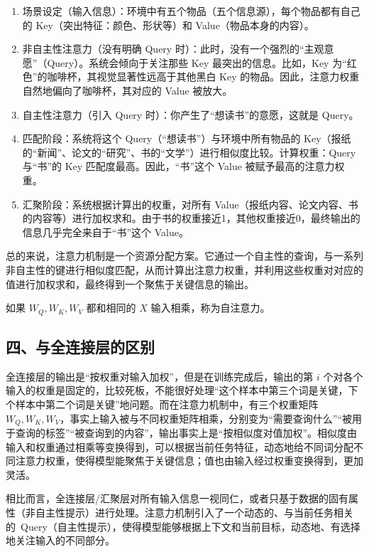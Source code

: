 \begin{enumerate}
\def\labelenumi{\arabic{enumi}.}
\item
  场景设定（输入信息）：环境中有五个物品（五个信息源），每个物品都有自己的 Key（突出特征：颜色、形状等）和 Value（物品本身的内容）。
\item
  非自主性注意力（没有明确 Query 时）：此时，没有一个强烈的``主观意愿''（Query）。系统会倾向于关注那些 Key 最突出的信息。比如，Key 为``红色''的咖啡杯，其视觉显著性远高于其他黑白 Key 的物品。因此，注意力权重自然地偏向了咖啡杯，其对应的 Value 被放大。
\item
  自主性注意力（引入 Query 时）：你产生了``想读书''的意愿，这就是 Query。
\item
  匹配阶段：系统将这个 Query（``想读书''）与环境中所有物品的 Key（报纸的``新闻''、论文的``研究''、书的``文学''）进行相似度比较。计算权重：Query 与``书''的 Key 匹配度最高。因此，``书''这个 Value 被赋予最高的注意力权重。
\item
  汇聚阶段：系统根据计算出的权重，对所有 Value（报纸内容、论文内容、书的内容等）进行加权求和。由于书的权重接近1，其他权重接近0，最终输出的信息几乎完全来自于``书''这个 Value。
\end{enumerate}

总的来说，注意力机制是一个资源分配方案。它通过一个自主性的查询，与一系列非自主性的键进行相似度匹配，从而计算出注意力权重，并利用这些权重对对应的值进行加权求和，最终得到一个聚焦于关键信息的输出。

如果 \(W_Q,W_K,W_V\) 都和相同的 \(X\) 输入相乘，称为自注意力。

\hypertarget{ux56dbux4e0eux5168ux8fdeux63a5ux5c42ux7684ux533aux522b}{%
\subsection{四、与全连接层的区别}\label{ux56dbux4e0eux5168ux8fdeux63a5ux5c42ux7684ux533aux522b}}

全连接层的输出是``按权重对输入加权''，但是在训练完成后，输出的第 \(i\) 个对各个输入的权重是固定的，比较死板，不能很好处理``这个样本中第三个词是关键，下个样本中第二个词是关键''地问题。而在注意力机制中，有三个权重矩阵 \(W_Q,W_K,W_V\)，事实上输入被与不同权重矩阵相乘，分别变为``需要查询什么''``被用于查询的标签''``被查询到的内容''，输出事实上是``按相似度对值加权''。相似度由输入和权重通过相乘等变换得到，可以根据当前任务特征，动态地给不同词分配不同注意力权重，使得模型能聚焦于关键信息；值也由输入经过权重变换得到，更加灵活。

相比而言，全连接层/汇聚层对所有输入信息一视同仁，或者只基于数据的固有属性（非自主性提示）进行处理。注意力机制引入了一个动态的、与当前任务相关的~Query（自主性提示），使得模型能够根据上下文和当前目标，动态地、有选择地关注输入的不同部分。

